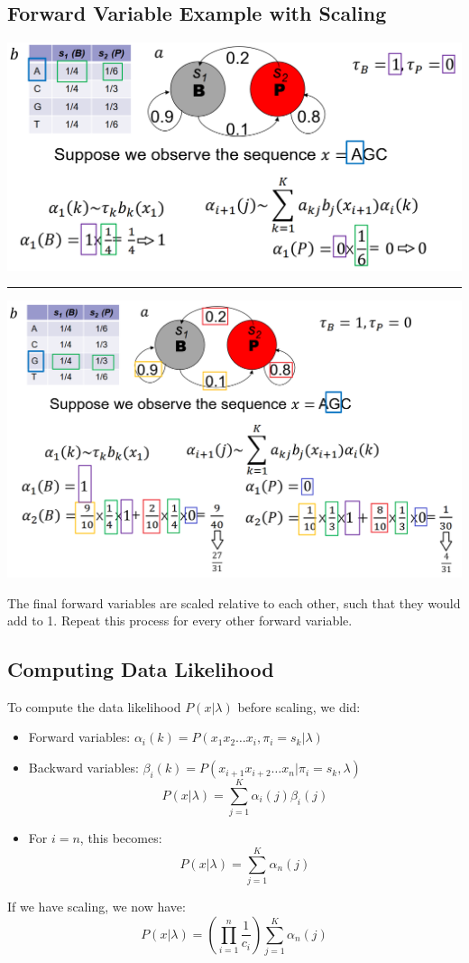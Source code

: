 \documentclass[10pt]{article}
\begin{document}
\subsection*{Forward Variable Example with Scaling}
\begin{center} 
	\includegraphics*[width=\textwidth]{W9_21.png}\\
    \rule{\textwidth}{2pt}
    \includegraphics*[width=\textwidth]{W9_22.png} 
\end{center}
The final forward variables are scaled relative to each other, such that they would add to 1.  Repeat this process for every other forward variable.

\subsection*{Computing Data Likelihood}
To compute the data likelihood $P(x | \lambda)$ before scaling, we did:
\begin{itemize}
	\item Forward variables: $\alpha_i(k) = P(x_1 x_2 \dots x_i, \pi_i = s_k | \lambda)$
	\item Backward variables: $\beta_i(k) = P(x_{i + 1} x_{i + 2} \dots x_n | \pi_i = s_k, \lambda)$
	\[P(x | \lambda) = \sum_{j = 1}^K \alpha_i (j) \beta_i(j)\]
    \item For $i = n$, this becomes:
    \[P(x | \lambda) = \sum_{j = 1}^K \alpha_n(j)\]
\end{itemize}
If we have scaling, we now have:
\[P(x | \lambda) = \left(\prod_{i = 1}^n \frac{1}{c_i}\right) \sum_{j = 1}^K \alpha_n(j)\]
\end{document}

